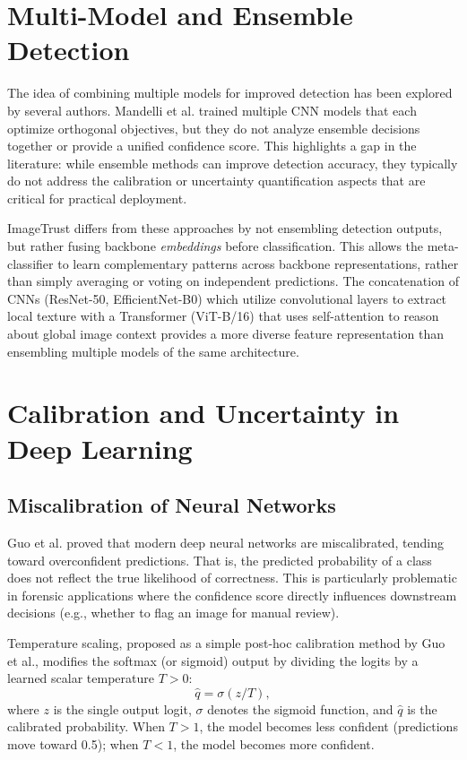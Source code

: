 \documentclass[12pt,a4paper]{book}
\theoremstyle{definition}
\theoremstyle{remark}
\begin{document}
\section{Multi-Model and Ensemble Detection}\label{sec:ensemble}

The idea of combining multiple models for improved detection has been explored by several authors. Mandelli et al. \cite{mandelli2022detecting} trained multiple CNN models that each optimize orthogonal objectives, but they do not analyze ensemble decisions together or provide a unified confidence score. This highlights a gap in the literature: while ensemble methods can improve detection accuracy, they typically do not address the calibration or uncertainty quantification aspects that are critical for practical deployment.

ImageTrust differs from these approaches by not ensembling detection outputs, but rather fusing backbone \textit{embeddings} before classification. This allows the meta-classifier to learn complementary patterns across backbone representations, rather than simply averaging or voting on independent predictions. The concatenation of CNNs (ResNet-50, EfficientNet-B0) which utilize convolutional layers to extract local texture with a Transformer (ViT-B/16) that uses self-attention to reason about global image context provides a more diverse feature representation than ensembling multiple models of the same architecture.


\section{Calibration and Uncertainty in Deep Learning}\label{sec:calib-related}

\subsection{Miscalibration of Neural Networks}\label{sec:miscalibration}

Guo et al. \cite{guo2017calibration} proved that modern deep neural networks are miscalibrated, tending toward overconfident predictions. That is, the predicted probability of a class does not reflect the true likelihood of correctness. This is particularly problematic in forensic applications where the confidence score directly influences downstream decisions (e.g., whether to flag an image for manual review).

Temperature scaling, proposed as a simple post-hoc calibration method by Guo et al., modifies the softmax (or sigmoid) output by dividing the logits by a learned scalar temperature $T > 0$:
\begin{equation}
\hat{q} = \sigma(z/T),
\end{equation}
where $z$ is the single output logit, $\sigma$ denotes the sigmoid function, and $\hat{q}$ is the calibrated probability. When $T > 1$, the model becomes less confident (predictions move toward 0.5); when $T < 1$, the model becomes more confident.
\end{document}
